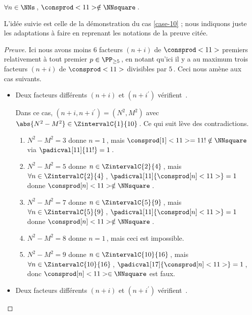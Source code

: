 \begin{fact} \label{case-11}
	 $\forall n \in \NNs$\,, $\consprod<11> \notin \NNsquare$\,.
\end{fact}



L'idée suivie est celle de la démonstration du cas \ref{case-10} ; nous indiquons juste les adaptations à faire en reprenant les notations de la preuve citée.


\begin{proof}[Preuve]%
    Ici nous avons moins $6$ facteurs $(n + i)$ de $\consprod<11>$ premiers relativement à tout premier $p \in \PP_{\geq 5}$\,, en notant qu'ici il y a au maximum trois facteurs $(n + i)$ de $\consprod<11>$ divisibles par $5$\,. Ceci nous amène aux cas suivants.
    \begin{itemize}
    	\medskip
		\item Deux facteurs différents $(n+i)$ et $(n+i^\prime)$ vérifient \,.
		
		\smallskip
		\noindent
		Dans ce cas, $(n+i, n+i^\prime) = (N^2, M^2)$ avec $\abs{N^2 - M^2} \in \ZintervalC{1}{10}$\,. Ce qui suit lève des contradictions.
		\begin{enumerate}
			\item $N^2 - M^2 = 3$ donne $n = 1$\,, mais $\consprod[1]<11> = 11 ! \notin \NNsquare$ via $\padicval[11]{11!} = 1$\,.


			\item $N^2 - M^2 = 5$ donne $n \in \ZintervalC{2}{4}$\,, mais $\forall n \in \ZintervalC{2}{4}$\,, $\padicval[11]{\consprod[n]<11>} = 1$ donne $\consprod[n]<11> \notin \NNsquare$\,.
			

			\item $N^2 - M^2 = 7$ donne $n \in \ZintervalC{5}{9}$\,, mais $\forall n \in \ZintervalC{5}{9}$\,, $\padicval[11]{\consprod[n]<11>} = 1$ donne $\consprod[n]<11> \notin \NNsquare$\,.


			\item $N^2 - M^2 = 8$ donne $n = 1$\,, mais ceci est impossible.

			\item $N^2 - M^2 = 9$ donne $n \in \ZintervalC{10}{16}$\,, mais $\forall n \in \ZintervalC{10}{16}$\,, $\padicval[17]{\consprod[n]<11>} = 1$\,, donc $\consprod[n]<11> \in \NNsquare$ est faux.
		\end{enumerate}


    	\medskip
		\item Deux facteurs différents $(n+i)$ et $(n+i^\prime)$ vérifient \,.
		

\end{itemize}
\end{proof}
